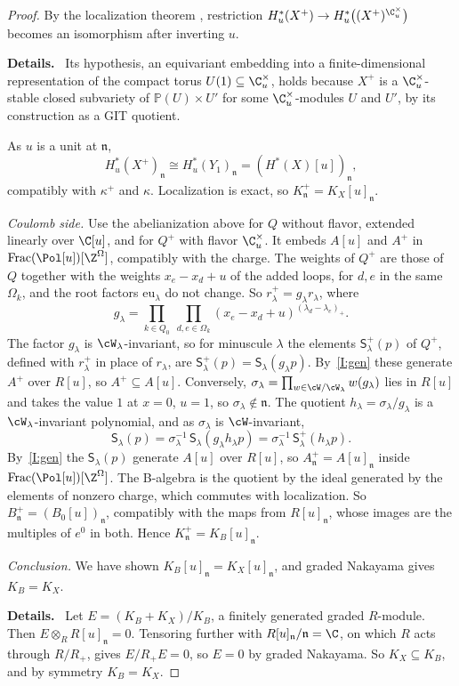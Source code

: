 \documentclass[11pt]{amsart}
\newenvironment{details}{\par\color{black!60!green}\noindent\textbf{Details.}\ }{\par}
\begin{document}
\begin{proof}
By the localization theorem \cite[Thm.~3]{brionEquivariantCohomology1998}, restriction
$H^*_u(X^+)\to H^*_u\big((X^+)^{\C^\times_u}\big)$ becomes an isomorphism after
inverting $u$.
\begin{details}
Its hypothesis, an equivariant embedding into a
finite-dimensional representation of the compact torus $U(1)\subseteq\C^\times_u$,
holds because $X^+$ is a $\C^\times_u$-stable closed subvariety of
$\mathbb P(U)\times U'$ for some $\C^\times_u$-modules $U$ and $U'$, by its
construction as a GIT quotient.
\end{details}
As $u$ is a unit at $\mathfrak n$,
\[
 H^*_u(X^+)_{\mathfrak n}\cong H^*_u(Y_1)_{\mathfrak n}=(H^*(X)[u])_{\mathfrak n},
\]
compatibly with $\kappa^+$ and $\kappa$.  Localization is exact, so
$K^+_{\mathfrak n}=K_X[u]_{\mathfrak n}$.

\emph{Coulomb side.}  Use the abelianization above for $Q$ without flavor,
extended linearly over $\C[u]$, and for $Q^+$ with flavor $\C^\times_u$.  It
embeds $A[u]$ and $A^+$ in $\mathrm{Frac}(\Pol[u])[\Z^\Omega]$, compatibly with
the charge.  The weights of $Q^+$ are those of $Q$ together with the weights
$x_e-x_d+u$ of the added loops, for $d,e$ in the same $\Omega_k$, and the root
factors $\mathrm{eu}_\lambda$ do not change.  So $r^+_\lambda=g_\lambda r_\lambda$,
where
\[
 g_\lambda=\prod_{k\in Q_0}\ \prod_{d,e\in\Omega_k}(x_e-x_d+u)^{(\lambda_d-\lambda_e)_+}.
\]
The factor $g_\lambda$ is $\cW_\lambda$-invariant, so for minuscule $\lambda$
the elements $\mathsf S^+_\lambda(p)$ of $Q^+$, defined with $r^+_\lambda$ in
place of $r_\lambda$, are $\mathsf S^+_\lambda(p)=\mathsf S_\lambda(g_\lambda p)$.
By~\ref{I:gen} these generate $A^+$ over $R[u]$, so $A^+\subseteq A[u]$.
Conversely, $\sigma_\lambda=\prod_{w\in\cW/\cW_\lambda}w(g_\lambda)$ lies in $R[u]$
and takes the value $1$ at $x=0$, $u=1$, so $\sigma_\lambda\notin\mathfrak n$.
The quotient $h_\lambda=\sigma_\lambda/g_\lambda$ is a $\cW_\lambda$-invariant
polynomial, and as $\sigma_\lambda$ is $\cW$-invariant,
\[
 \mathsf S_\lambda(p)=\sigma_\lambda^{-1}\,\mathsf S_\lambda(g_\lambda h_\lambda p)
 =\sigma_\lambda^{-1}\,\mathsf S^+_\lambda(h_\lambda p).
\]
By~\ref{I:gen} the $\mathsf S_\lambda(p)$ generate $A[u]$ over $R[u]$, so
$A^+_{\mathfrak n}=A[u]_{\mathfrak n}$ inside $\mathrm{Frac}(\Pol[u])[\Z^\Omega]$.
The B-algebra is the quotient by the ideal generated by the elements of
nonzero charge, which commutes with localization.  So $B^+_{\mathfrak
n}=(B_0[u])_{\mathfrak n}$, compatibly with the maps from $R[u]_{\mathfrak n}$,
whose images are the multiples of $e^0$ in both.  Hence $K^+_{\mathfrak
n}=K_B[u]_{\mathfrak n}$.

\emph{Conclusion.}  We have shown $K_B[u]_{\mathfrak n}=K_X[u]_{\mathfrak n}$,
and graded Nakayama gives $K_B=K_X$.
\begin{details}
Let $E=(K_B+K_X)/K_B$, a finitely generated graded $R$-module.  Then
$E\otimes_RR[u]_{\mathfrak n}=0$.  Tensoring further with $R[u]_{\mathfrak
n}/\mathfrak n=\C$, on which $R$ acts through $R/R_+$, gives $E/R_+E=0$, so
$E=0$ by graded Nakayama.  So $K_X\subseteq K_B$, and by symmetry $K_B=K_X$.
\end{details}
\end{proof}
\end{document}
